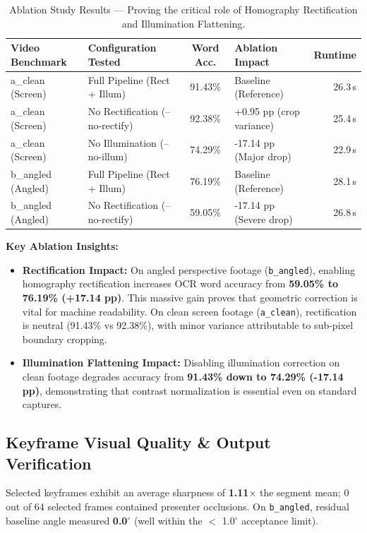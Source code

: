 \documentclass[10pt,a4paper]{article}
\begin{document}
\begin{table}[h!]
\small
\centering
\begin{tabularx}{\textwidth}{@{} l p{52mm} c p{40mm} r @{}}
\toprule
\rowcolor{slate}\color{white}\textbf{Video Benchmark} & \color{white}\textbf{Configuration Tested} & \color{white}\textbf{Word Acc.} & \color{white}\textbf{Ablation Impact} & \color{white}\textbf{Runtime} \\
\midrule
a\_clean (Screen) & Full Pipeline (Rect + Illum) & 91.43\% & Baseline (Reference) & 26.3\,s \\
a\_clean (Screen) & No Rectification (--no-rectify) & 92.38\% & +0.95 pp (crop variance) & 25.4\,s \\
a\_clean (Screen) & No Illumination (--no-illum) & 74.29\% & -17.14 pp (Major drop) & 22.9\,s \\
b\_angled (Angled) & Full Pipeline (Rect + Illum) & 76.19\% & Baseline (Reference) & 28.1\,s \\
b\_angled (Angled) & No Rectification (--no-rectify) & 59.05\% & -17.14 pp (Severe drop) & 26.8\,s \\
\bottomrule
\end{tabularx}
\caption{Ablation Study Results — Proving the critical role of Homography Rectification and Illumination Flattening.}
\end{table}

\textbf{Key Ablation Insights:}
\begin{itemize}[leftmargin=6mm, itemsep=1pt, topsep=2pt]
  \item \textbf{Rectification Impact:} On angled perspective footage (\texttt{b\_angled}), enabling homography rectification increases OCR word accuracy from \textbf{59.05\% to 76.19\% (+17.14 pp)}. This massive gain proves that geometric correction is vital for machine readability. On clean screen footage (\texttt{a\_clean}), rectification is neutral (91.43\% vs 92.38\%), with minor variance attributable to sub-pixel boundary cropping.
  \item \textbf{Illumination Flattening Impact:} Disabling illumination correction on clean footage degrades accuracy from \textbf{91.43\% down to 74.29\% (-17.14 pp)}, demonstrating that contrast normalization is essential even on standard captures.
\end{itemize}

\subsection{Keyframe Visual Quality \& Output Verification}
Selected keyframes exhibit an average sharpness of \textbf{1.11$\times$} the segment mean; 0 out of 64 selected frames contained presenter occlusions. On \texttt{b\_angled}, residual baseline angle measured \textbf{0.0$^\circ$} (well within the $<$ 1.0$^\circ$ acceptance limit).
\end{document}
